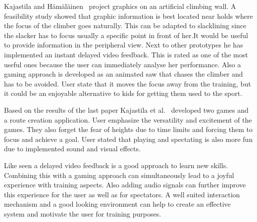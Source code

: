Kajastila and Hämäläinen~\cite{Kajastila2014-ug} project graphics on an artificial climbing wall. A feasibility study showed that graphic information is best located near holds where the focus of the climber goes naturally. 
This can be adapted to slacklining since the slacker has to focus usually a specific point in front of her.It would be useful to provide information in the peripheral view. Next to other prototypes he has implemented an instant delayed video feedback. This is rated as one of the most useful ones because the user can immediately analyse her performance. Also a gaming approach is developed as an animated saw that chases the climber and has to be avoided. User state that it moves the focus away from the training, but it could be an enjoyable alternative to kids for getting them used to the sport. 

Based on the results of the last paper Kajastila et al.~\cite{Kajastila2016-ot} developed two games and a route creation application. User emphasize the versatility and excitement of the games. They also forget the fear of heights due to time limits and forcing them to focus and achieve a goal. User stated that playing and spectating is also more fun due to implemented sound and visual effects.

Like seen a delayed video feedback is a good approach to learn new skills. Combining this with a gaming approach can simultaneously lead to a joyful experience with training aspects. Also adding audio signals can further improve this experience for the user as well as for spectators. A well suited interaction mechanism and a good looking environment can help to create an effective system and motivate the user for training purposes.

